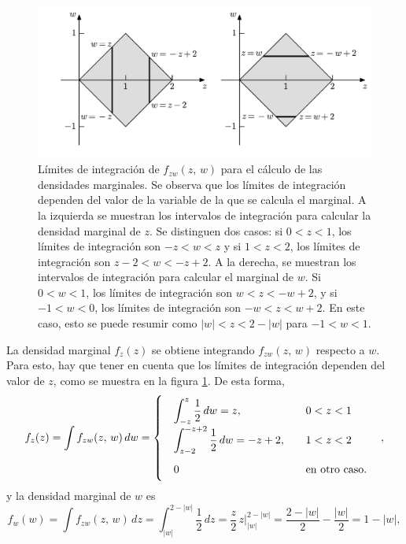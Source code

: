 \documentclass[a4paper]{report}
\begin{document}
\begin{figure}[!htb]
\begin{center}
 \includegraphics[width=0.9\columnwidth]{figuras/joint_distribution_sum_sub_marginals.pdf}
\caption{\label{fig:joint_distribution_sum_sub_marginals} Límites de integración de \(f_{zw}(z,\,w)\) para el cálculo de las densidades marginales. Se observa que los límites de integración dependen del valor de la variable de la que se calcula el marginal. A la izquierda se muestran los intervalos de integración para calcular la densidad marginal de \(z\). Se distinguen dos casos: si \(0<z<1\), los límites de integración son \(-z<w<z\) y si \(1<z<2\), los límites de integración son \(z-2<w<-z+2\). A la derecha, se muestran los intervalos de integración para calcular el marginal de \(w\). Si \(0<w<1\), los límites de integración son \(w<z<-w+2\), y si \(-1<w<0\), los límites de integración son \(-w<z<w+2\). En este caso, esto se puede resumir como \(|w|<z<2-|w|\) para \(-1<w<1\).}
\end{center}
\end{figure}
La densidad marginal \(f_z(z)\) se obtiene integrando \(f_{zw}(z,\,w)\) respecto a \(w\). Para esto, hay que tener en cuenta que los límites de integración dependen del valor de \(z\), como se muestra en la figura \ref{fig:joint_distribution_sum_sub_marginals}. 
De esta forma,
\begin{equation}\label{eq:joint_distribution_sum_sub_z}
 f_z(z)=\int f_{zw}(z,\,w)\,dw
\def\arraystretch{2}\arraycolsep=10pt
 =\left\{\begin{array}{ll}
   \displaystyle\int_{-z}^{z}\dfrac{1}{2}\,dw=z, &  0<z<1\\
   \displaystyle\int_{z-2}^{-z+2}\dfrac{1}{2}\,dw=-z+2, & 1<z<2\\ 
   0 & \textrm{en otro caso.}
 \end{array} \right., 
\end{equation}
y la densidad marginal de \(w\) es
\[
 f_w(w)=\int f_{zw}(z,\,w)\,dz=\int_{|w|}^{2-|w|}\dfrac{1}{2}\,dz=\frac{z}{2}\,z\bigg|_{|w|}^{2-|w|}
 =\frac{2-|w|}{2}-\frac{|w|}{2}=1-|w|,
\]
\end{document}
